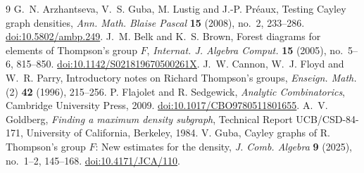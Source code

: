 \documentclass[11pt,a4paper]{article}
\theoremstyle{definition}
\theoremstyle{remark}
\begin{document}
\begin{thebibliography}{9}
G.~N. Arzhantseva, V.~S. Guba, M. Lustig and J.-P. Pr\'eaux,
Testing Cayley graph densities,
\emph{Ann. Math. Blaise Pascal} \textbf{15} (2008), no.~2, 233--286.
\href{https://doi.org/10.5802/ambp.249}{doi:10.5802/ambp.249}.
J.~M. Belk and K.~S. Brown,
Forest diagrams for elements of Thompson's group $F$,
\emph{Internat. J. Algebra Comput.} \textbf{15} (2005), no.~5--6, 815--850.
\href{https://doi.org/10.1142/S021819670500261X}{doi:10.1142/S021819670500261X}.
J.~W. Cannon, W.~J. Floyd and W.~R. Parry,
Introductory notes on Richard Thompson's groups,
\emph{Enseign. Math.} (2) \textbf{42} (1996), 215--256.
P. Flajolet and R. Sedgewick,
\emph{Analytic Combinatorics}, Cambridge University Press, 2009.
\href{https://doi.org/10.1017/CBO9780511801655}{doi:10.1017/CBO9780511801655}.
A.~V. Goldberg,
\emph{Finding a maximum density subgraph},
Technical Report UCB/CSD-84-171, University of California, Berkeley, 1984.
V. Guba,
Cayley graphs of R. Thompson's group $F$: New estimates for the density,
\emph{J. Comb. Algebra} \textbf{9} (2025), no.~1--2, 145--168.
\href{https://doi.org/10.4171/JCA/110}{doi:10.4171/JCA/110}.
\end{thebibliography}
\end{document}
